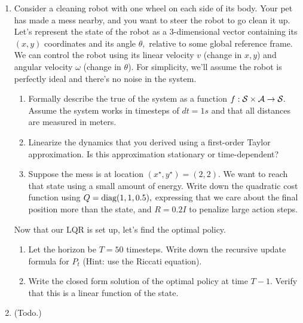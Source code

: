 \documentclass[../main/main]{subfiles}
\begin{document}
\begin{enumerate}
\item Consider a cleaning robot with one wheel on each side of its body. Your pet has made a mess nearby, and you want to steer the robot to go clean it up.
Let's represent the state of the robot as a $3$-dimensional vector containing its $(x, y)$ coordinates and its angle $\theta,$ relative to some global reference frame.
We can control the robot using its linear velocity $v$ (change in $x, y$) and angular velocity $\omega$ (change in $\theta$).
For simplicity, we'll assume the robot is perfectly ideal and there's no noise in the system.
\begin{enumerate}
    \item Formally describe the true of the system as a function $f : \mathcal{S} \times \mathcal{A} \to \mathcal{S}.$ Assume the system works in timesteps of $dt = 1 s$ and that all distances are measured in meters.
    \item Linearize the dynamics that you derived using a first-order Taylor approximation. Is this approximation stationary or time-dependent?
    \item Suppose the mess is at location $(x^\star, y^\star) = (2, 2).$ We want to reach that state using a small amount of energy. Write down the quadratic cost function using $Q = \operatorname*{\textrm{diag}}(1, 1, 0.5),$ expressing that we care about the final position more than the state, and $R = 0.2 I$ to penalize large action steps.
\end{enumerate}
Now that our LQR is set up, let's find the optimal policy.
\begin{enumerate}
    \item Let the horizon be $T = 50$ timesteps. Write down the recursive update formula for $P_t$ (Hint: use the Riccati equation).
    \item Write the closed form solution of the optimal policy at time $T-1.$ Verify that this is a linear function of the state. 
\end{enumerate}

\item (Todo.)


\end{enumerate}
\end{document}
